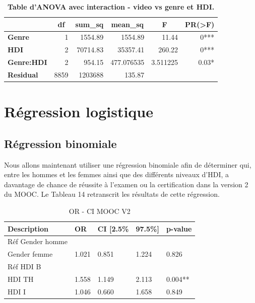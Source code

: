 \documentclass[12pt, a4paper, titlepage, table]{article}
\begin{document}
	\begin{table}[H]
		\centering
		\fontsize{12}{20}\selectfont
		\begin{tabular}{|l|r|r|r|r|r|}
			\hline
			\multicolumn{1}{|c|}{\textbf{}}&
			\multicolumn{1}{c|}{\textbf{df}}&
			\multicolumn{1}{c|}{\textbf{sum\_sq}}&
			\multicolumn{1}{c|}{\textbf{mean\_sq}}&
			\multicolumn{1}{c|}{\textbf{F}}&
			\multicolumn{1}{c|}{\textbf{PR(>F)}}\\
			\hline
				\textbf{Genre}&	1&	1554.89&	1554.89&	11.44&	0***\\
				\textbf{HDI}&	2&	70714.83&	35357.41&	260.22&	0***\\
				\textbf{Genre:HDI}&2&	954.15&	477.076535&	3.511225&0.03*\\
				\textbf{Residual}&	8859&	1203688&	135.87&	&	\\
			\hline
		\end{tabular}
	\caption{\textbf{Table d'ANOVA avec interaction - video vs genre et HDI.}}
\end{table}


\section{Régression logistique}
\subsection{Régression binomiale}
Nous allons maintenant utiliser une régression binomiale afin de déterminer qui, entre les hommes et les femmes ainsi que des
différents niveaux d'HDI, a davantage de chance de réussite à l'examen ou la certification dans la version 2 du MOOC.
Le Tableau 14 retranscrit les résultats de cette régression.

	\begin{table}[H]
		\centering
		\begin{tabular}{@{}lllll@{}}
		\toprule
		Description & OR & CI [2.5\% & 97.5\%] & p-value \\
		\midrule
		Réf Gender homme & & & & \\
		Gender femme & 1.021 & 0.851 & 1.224 & 0.826 \\
		Réf HDI B & & & & \\
		HDI TH & 1.558 & 1.149 & 2.113 & 0.004** \\
		HDI I & 1.046 & 0.660 & 1.658 & 0.849 \\
		\bottomrule
		\end{tabular}
		\caption{OR - CI MOOC V2}
		\end{table}
\end{document}
